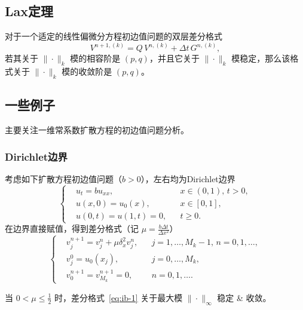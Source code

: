 \subsection{Lax定理}


\begin{theorem}[Lax定理]
    对于一个适定的线性偏微分方程初边值问题的双层差分格式
    \[
        V^{n+1,(k)} = Q \, V^{n,(k)} + \Delta t\, G^{n,(k)},
    \]
    若其关于 $\|\cdot\|_k$ 模的相容阶是 $(p,q)$，并且它关于 $\|\cdot\|_k$ 模稳定，那么该格式关于 $\|\cdot\|_k$ 模的收敛阶是 $(p,q)$。
\end{theorem}

\subsection{一些例子}

主要关注一维常系数扩散方程的初边值问题分析。

\subsubsection{Dirichlet边界}

考虑如下扩散方程初边值问题（$b > 0$），左右均为Dirichlet边界
\[
    \left\{
    \begin{aligned}
         & u_t = b u_{xx},      &  & x \in (0,1),\, t > 0, \\
         & u(x,0) = u_0(x),     &  & x \in [0,1],          \\
         & u(0,t) = u(1,t) = 0, &  & t \ge 0.
    \end{aligned}
    \right.
\]
在边界直接赋值，得到差分格式（记 $\mu = \frac{ b \Delta t}{\Delta x^2}$）
\begin{equation}
    \left\{
    \begin{aligned}
         & v_j^{n+1} = v_j^n + \mu \delta_x^2 v_j^n, &  & j=1,\dots,M_k-1,\, n=0,1,\dots, \\
         & v_j^0 = u_0(x_j),                         &  & j=0,\dots,M_k,                  \\
         & v_0^{n+1} = v_{M_k}^{n+1} = 0,            &  & n=0,1,\dots.
    \end{aligned}
    \right. \label{eq:ib-1}
\end{equation}


\begin{example}
    当 $0 < \mu \le \frac12$ 时，差分格式~\eqref{eq:ib-1} 关于最大模 $\|\cdot\|_{\infty}$ 稳定 \& 收敛。
\end{example}

